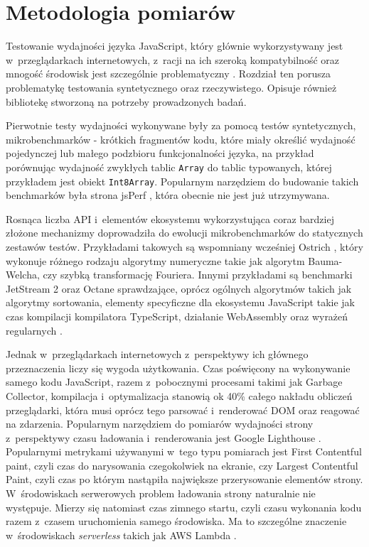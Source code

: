\chapter{Metodologia pomiarów}

Testowanie wydajności języka JavaScript, który głównie wykorzystywany jest w~przeglądarkach internetowych, z~racji na ich szeroką kompatybilność oraz mnogość środowisk jest szczególnie problematyczny \cite{v8-real-perf}. Rozdział ten porusza problematykę testowania syntetycznego oraz rzeczywistego. Opisuje również bibliotekę stworzoną na potrzeby prowadzonych badań.

Pierwotnie testy wydajności wykonywane były za pomocą testów syntetycznych, mikrobenchmarków - krótkich fragmentów kodu, które miały określić wydajność pojedynczej lub małego podzbioru funkcjonalności języka, na przykład porównując wydajność zwykłych tablic \mbox{\lstinline{Array}} do tablic typowanych, której przykładem jest obiekt \lstinline{Int8Array}. Popularnym narzędziem do budowanie takich benchmarków była strona jsPerf \cite{jsperf}, która obecnie nie jest już utrzymywana.

Rosnąca liczba API i~elementów ekosystemu wykorzystująca coraz bardziej złożone mechanizmy doprowadziła do ewolucji mikrobenchmarków do statycznych zestawów testów. Przykładami takowych są wspomniany wcześniej Ostrich \cite{ostrich}, który wykonuje różnego rodzaju algorytmy numeryczne takie jak algorytm Bauma-Welcha, czy szybką transformację Fouriera. Innymi przykładami są benchmarki JetStream 2 oraz Octane sprawdzające, oprócz ogólnych algorytmów takich jak algorytmy sortowania, elementy specyficzne dla ekosystemu JavaScript takie jak czas kompilacji kompilatora TypeScript, działanie WebAssembly oraz wyrażeń regularnych \cite{octane, jetstream}.

Jednak w~przeglądarkach internetowych z~perspektywy ich głównego przeznaczenia liczy się wygoda użytkowania. Czas poświęcony na wykonywanie samego kodu JavaScript, razem z~pobocznymi procesami takimi jak Garbage Collector, kompilacja i~optymalizacja stanowią ok 40\% całego nakładu obliczeń przeglądarki, która musi oprócz tego parsować i~renderować DOM oraz reagować na zdarzenia. Popularnym narzędziem do pomiarów wydajności strony z~perspektywy czasu ładowania i~renderowania jest Google Lighthouse \cite{lighthouse}. Popularnymi metrykami używanymi w~tego typu pomiarach jest First Contentful paint, czyli czas do narysowania czegokolwiek na ekranie, czy Largest Contentful Paint, czyli czas po którym nastąpiła największe przerysowanie elementów strony. W~środowiskach serwerowych problem ładowania strony naturalnie nie występuje. Mierzy się natomiast czas zimnego startu, czyli czasu wykonania kodu razem z~czasem uruchomienia samego środowiska. Ma to szczególne znaczenie w~środowiskach \textit{serverless} takich jak AWS Lambda \cite{aws-lambda}.


